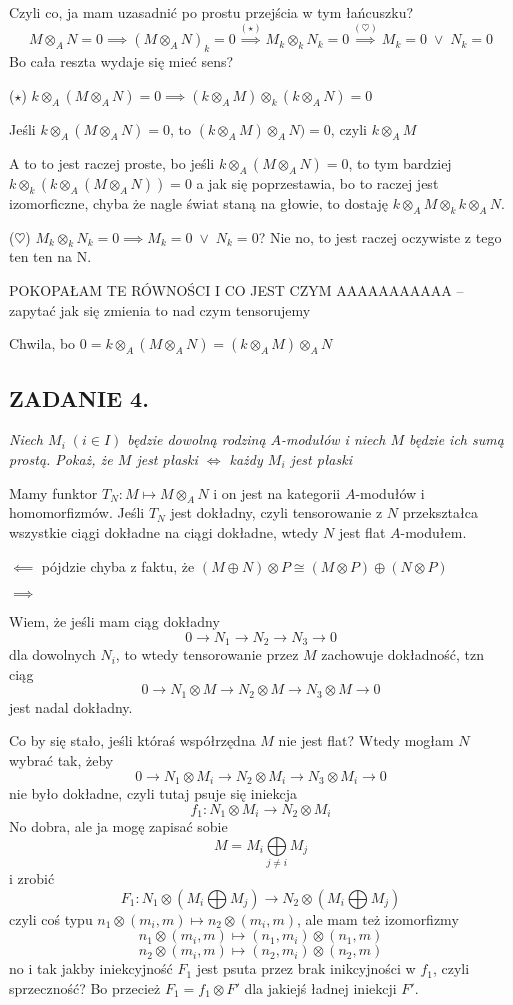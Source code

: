 \documentclass{article}
\begin{document}
Czyli co, ja mam uzasadnić po prostu przejścia w tym łańcuszku?
$$M\otimes_AN=0\implies(M\otimes_AN)_k=0\overset{(\star)}{\implies} M_k\otimes_kN_k=0\overset{(\heartsuit)}{\implies} M_k=0\;\lor\;N_k=0$$
Bo cała reszta wydaje się mieć sens?

($\star$) $k\otimes_A (M\otimes_AN)=0\implies(k\otimes_AM)\otimes_k(k\otimes_AN)=0$

Jeśli $k\otimes_A(M\otimes_AN)=0$, to $(k\otimes_AM)\otimes_AN)=0$, czyli $k\otimes_AM$

A to to jest raczej proste, bo jeśli $k\otimes_A(M\otimes_AN)=0$, to tym bardziej $k\otimes_k(k\otimes_A(M\otimes_AN))=0$ a jak się poprzestawia, bo to raczej jest izomorficzne, chyba że nagle świat staną na głowie, to dostaję $k\otimes_AM\otimes_kk\otimes_AN$.

($\heartsuit$) $M_k\otimes_kN_k=0\implies M_k=0\;\lor\;N_k=0$? Nie no, to jest raczej oczywiste z tego ten ten na N.

{\color{orange}POKOPAŁAM TE RÓWNOŚCI I CO JEST CZYM AAAAAAAAAAA -- zapytać jak się zmienia to nad czym tensorujemy}

Chwila, bo $0=k\otimes_A(M\otimes_AN)=(k\otimes_AM)\otimes_AN$

\subsection*{ZADANIE 4.}
\emph{\color{yellow}Niech $M_i\;(i\in I)$ będzie dowolną rodziną $A$-modułów i niech $M$ będzie ich sumą prostą. Pokaż, że $M$ jest płaski $\iff$ każdy $M_i$ jest płaski}
\smallskip

Mamy funktor $T_N:M\mapsto M\otimes_A N$ i on jest na kategorii $A$-modułów i homomorfizmów. Jeśli $T_N$ jest dokładny, czyli tensorowanie z $N$ przekształca wszystkie ciągi dokładne na ciągi dokładne, wtedy $N$ jest {\color{blue}flat} $A$-modułem.

$\impliedby$ pójdzie chyba z faktu, że $(M\oplus N)\otimes P\cong (M\otimes P)\oplus(N\otimes P)$

$\implies$ 

Wiem, że jeśli mam ciąg dokładny
$$0\to N_1\to N_2\to N_3\to 0$$
dla dowolnych $N_i$, to wtedy tensorowanie przez $M$ zachowuje dokładność, tzn ciąg
$$0\to N_1\otimes M\to N_2\otimes M\to N_3\otimes M\to 0$$
jest nadal dokładny.

Co by się stało, jeśli któraś współrzędna $M$ nie jest flat? Wtedy mogłam $N$ wybrać tak, żeby
$$0\to N_1\otimes M_i\to N_2\otimes M_i\to N_3\otimes M_i\to 0$$
nie było dokładne, czyli tutaj psuje się iniekcja
$$f_1:N_1\otimes M_i\to N_2\otimes M_i$$
No dobra, ale ja mogę zapisać sobie
$$M=M_i\bigoplus\limits_{j\neq i}M_j$$
i zrobić
$$F_1:N_1\otimes(M_i\bigoplus M_j)\to N_2\otimes(M_i\bigoplus M_j)$$
czyli coś typu $n_1\otimes (m_i, m)\mapsto n_2\otimes (m_i, m)$, ale mam też izomorfizmy
$$n_1\otimes (m_i, m)\mapsto (n_1, m_i)\otimes (n_1,m)$$
$$n_2\otimes (m_i, m)\mapsto(n_2,m_i)\otimes (n_2, m)$$
no i tak jakby iniekcyjność $F_1$ jest psuta przez brak inikcyjności w $f_1$, czyli sprzeczność?
Bo przecież $F_1=f_1\otimes F'$ dla jakiejś ładnej iniekcji $F'$.
\end{document}
